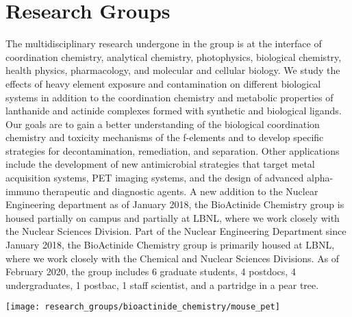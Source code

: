 
\section*{Research Groups}



\begin{minipage}{0.7\textwidth}
	The multidisciplinary research undergone in the group is at the interface of coordination chemistry, analytical chemistry, photophysics, biological chemistry, health physics, pharmacology, and molecular and cellular biology. 
	We study the effects of heavy element exposure and contamination on different biological systems in addition to the coordination chemistry and metabolic properties of lanthanide and actinide complexes formed with synthetic and biological ligands. 
	Our goals are to gain a better understanding of the biological coordination chemistry and toxicity mechanisms of the f-elements and to develop specific strategies for decontamination, remediation, and separation. 
	Other applications include the development of new antimicrobial strategies that target metal acquisition systems, PET imaging systems, and the design of advanced alpha-immuno therapeutic and diagnostic agents. 
	A new addition to the Nuclear Engineering department as of January 2018, the BioActinide Chemistry group is housed partially on campus and partially at LBNL, where we work closely with the Nuclear Sciences Division. 
	Part of the Nuclear Engineering Department since January 2018, the BioActinide Chemistry group is primarily housed at LBNL, where we work closely with the Chemical and Nuclear Sciences Divisions.
	As of February 2020, the group includes 6 graduate students, 4 postdocs, 4 undergraduates, 1 postbac, 1 staff scientist, and a partridge in a pear tree.
\end{minipage}
\begin{minipage}{0.3\textwidth}
	\texttt{[image: research\_groups/bioactinide\_chemistry/mouse\_pet]}
\end{minipage}


